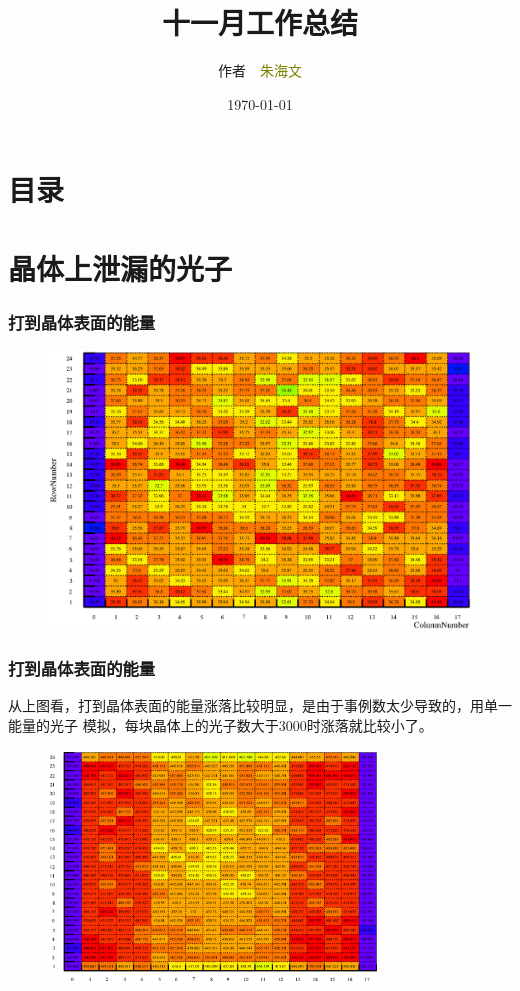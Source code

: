 \documentclass{beamer}
\newcommand{\liuhao}{\fontsize{7.875pt}{\baselineskip}\selectfont}
\begin{document}
\begin{CJK*}{UTF8}{gkai}
  \title{十一月工作总结}
  \author[\textcolor{black}{作者 朱海文}]{作者~~\textcolor{olive}{朱海文}}
  \institute{\textcolor{violet}{摩科特医疗器械有限公司}}
  \date{\today}
  \frame{\titlepage}
  \section*{目录}
  \section{晶体上泄漏的光子}
  \begin{frame}\frametitle{打到晶体表面的能量}
    \begin{figure}[ht]
      \includegraphics[width=\textwidth]{AttachCrystalEnergy.eps}
    \end{figure}
  \end{frame}
  \begin{frame}\frametitle{打到晶体表面的能量}
    \begin{minipage}[t]{0.2\textwidth}
      \liuhao
      从上图看，打到晶体表面的能量涨落比较明显，是由于事例数太少导致的，用单一能量的光子
      模拟，每块晶体上的光子数大于3000时涨落就比较小了。
    \end{minipage}
    \begin{minipage}[t]{0.8\textwidth}
      \vskip -0.5cm
      \begin{figure}[ht]
	\includegraphics[width=0.78\textwidth]{SingleEnergyWaterDirectEnergy.eps}
	

\end{figure}
\end{minipage}
\end{frame}
\end{CJK*}
\end{document}
